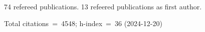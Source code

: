 74 refereed publications. 13 refeered publications as first author.

Total citations~=~4548; h-index~=~36 (2024-12-20)